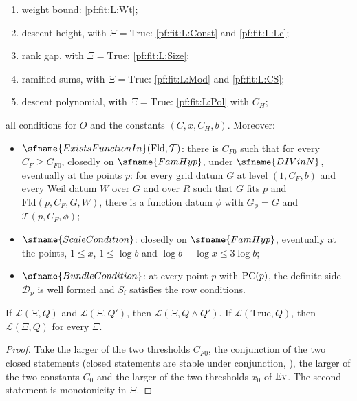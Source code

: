 \begin{definition}
\begin{enumerate}[label=(F\arabic*),leftmargin=*]
\item\label{pf:fit:F:Wt} weight bound: \ref{pf:fit:L:Wt};
\item\label{pf:fit:F:DesH} descent height, with $\Xi=\mathrm{True}$: \ref{pf:fit:L:Const} and \ref{pf:fit:L:Lc};
\item\label{pf:fit:F:Rank} rank gap, with $\Xi=\mathrm{True}$: \ref{pf:fit:L:Size};
\item\label{pf:fit:F:Ram} ramified sums, with $\Xi=\mathrm{True}$: \ref{pf:fit:L:Mod} and \ref{pf:fit:L:CS};
\item\label{pf:fit:F:Pol} descent polynomial, with $\Xi=\mathrm{True}$: \ref{pf:fit:L:Pol} with $C_H$;
\end{enumerate}
all conditions for $O$ and the constants $(C,x,C_H,b)$. Moreover:
\begin{itemize}
\item $\sfname{ExistsFunctionIn}(\mathrm{Fld},\mathcal T)$: there is $C_{F0}$ such that for every $C_F\ge C_{F0}$,
closedly on $\sfname{FamHyp}$, under $\sfname{DIVinN}$, eventually at the points $p$: for every grid datum $G$ at level
$(1,C_F,b)$ and every Weil datum $W$ over $G$ and over $R$ such that $G$ fits $p$ and $\mathrm{Fld}(p,C_F,G,W)$, there is a
function datum $\phi$ with $G_\phi=G$ and $\mathcal T(p,C_F,\phi)$;
\item $\sfname{ScaleCondition}$: closedly on $\sfname{FamHyp}$, eventually at the points, $1\le x$, $1\le\log b$ and
$\log b+\log x\le3\log b$;
\item $\sfname{BundleCondition}$: at every point $p$ with $\mathrm{PC}(p)$, the definite side $\mathcal D_p$ is well formed and
$S_{\mathrm f}$ satisfies the row conditions.
\end{itemize}
\end{definition}

\begin{lemma}\label{pf:fit:leafand}
If $\mathcal L(\Xi,Q)$ and $\mathcal L(\Xi,Q')$, then $\mathcal L(\Xi,Q\wedge Q')$. If $\mathcal L(\mathrm{True},Q)$,
then $\mathcal L(\Xi,Q)$ for every $\Xi$.
\end{lemma}

\begin{proof}
Take the larger of the two thresholds $C_{F0}$, the conjunction of the two closed statements (closed statements are
stable under conjunction, ), the larger of the two constants $C_0$ and the
larger of the two thresholds $x_0$ of $\mathrm{Ev}$. The second statement is monotonicity in $\Xi$.
\end{proof}

